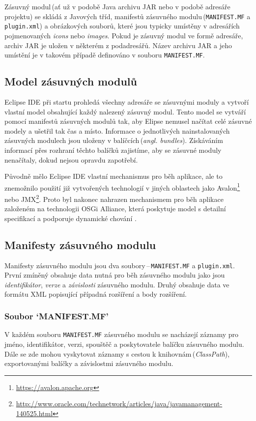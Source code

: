   Zásuvný modul\,(ať už v podobě Java archivu JAR nebo v podobě adresáře projektu) se skládá z Javových tříd, manifestů zásuvného modulu\,(\texttt{MANIFEST.MF} a \texttt{plugin.xml}) a obrázkových souborů, které jsou typicky umístěny v adresářích pojmenovaných \emph{icons} nebo \emph{images}. Pokud je zásuvný modul ve formě adresáře, archiv JAR je uložen v některém z podadresářů. Název archivu JAR a jeho umístění je v takovém případě definováno v souboru \texttt{MANIFEST.MF}.

    \subsection{Model zásuvných modulů}
    Eclipse IDE při startu prohledá všechny adresáře se zásuvnými moduly a vytvoří vlastní model obsahující každý nalezený zásuvný modul. Tento model se vytváří pomocí manifestů zásuvných modulů tak, aby Elipse nemusel načítat celé zásuvné modely a ušetřil tak čas a místo. Informace o jednotlivých nainstalovaných zásuvných modulech jsou uloženy v balíčcích\,(\emph{angl. bundles}). Získáváním informací přes rozhraní těchto balíčků zajistíme, aby se zásuvné moduly nenačítaly, dokud nejsou opravdu zapotřebí.

    Původně mělo Eclipse IDE vlastní mechanismus pro běh aplikace, ale to znemožnilo použití již vytvořených technologií v jiných oblastech jako Avalon\footnote{\url{https://avalon.apache.org}} nebo JMX\footnote{\url{http://www.oracle.com/technetwork/articles/java/javamanagement-140525.html}}. Proto byl nakonec nahrazen mechanismem pro běh aplikace založeném na technologii OSGi Alliance, která poskytuje model s detailní specifikací a podporuje dynamické chování \cite{Plugins}.

    \subsection{Manifesty zásuvného modulu}
    Manifesty zásuvného modulu jsou dva soubory\,--\,\texttt{MANIFEST.MF} a \texttt{plugin.xml}. První zmíněný obsahuje data nutná pro běh zásuvného modulu jako jsou \emph{identifikátor}, \emph{verze} a \emph{závislosti} zásuvného modulu. Druhý obsahuje data ve formátu XML popisující případná rozšíření a body rozšíření.

      \subsubsection{Soubor `MANIFEST.MF'}
      V každém souboru \texttt{MANIFEST.MF} zásuvného modulu se nacházejí záznamy pro jméno, identifikátor, verzi, spouštěč a poskytovatele balíčku zásuvného modulu. Dále se zde mohou vyskytovat záznamy s cestou k knihovnám\,(\emph{ClassPath}), exportovanými balíčky a závislostmi zásuvného modulu.

